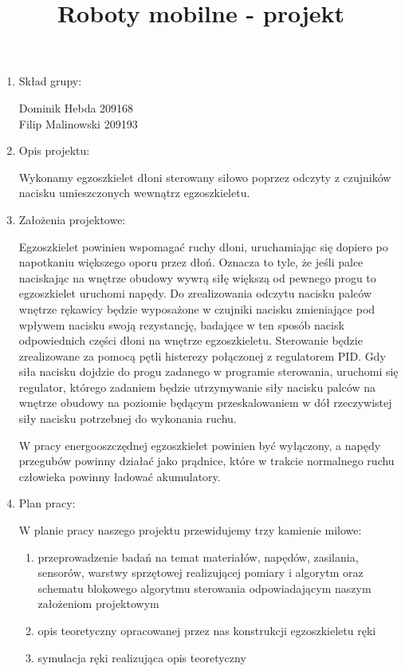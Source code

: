 \documentclass[a4paper]{article}
\title{Roboty mobilne - projekt}
\date{}
\begin{document}
\maketitle

\begin{enumerate}

\item Skład grupy:

Dominik Hebda 209168 \\
Filip Malinowski 209193

\item Opis projektu:

Wykonamy egzoszkielet dłoni sterowany siłowo poprzez odczyty z czujników nacisku umieszczonych wewnątrz egzoszkieletu.

\item Założenia projektowe:

Egzoszkielet powinien wspomagać ruchy dłoni, uruchamiając się dopiero po napotkaniu większego oporu przez dłoń. Oznacza to tyle, że jeśli palce naciskając na wnętrze obudowy wywrą siłę większą od pewnego progu to egzoszkielet uruchomi napędy.
Do zrealizowania odczytu nacisku palców wnętrze rękawicy będzie wyposażone w czujniki nacisku zmieniające pod wpływem nacisku swoją rezystancję, badające w ten sposób nacisk odpowiednich części dłoni na wnętrze egzoszkieletu.
Sterowanie będzie zrealizowane za pomocą pętli histerezy połączonej z regulatorem PID. Gdy siła nacisku dojdzie do progu zadanego w programie sterowania, uruchomi się regulator, którego zadaniem będzie utrzymywanie siły nacisku palców na wnętrze obudowy na poziomie będącym przeskalowaniem w dół rzeczywistej siły nacisku potrzebnej do wykonania ruchu.

W pracy energooszczędnej egzoszkielet powinien być wyłączony, a napędy przegubów powinny działać jako prądnice, które w trakcie normalnego ruchu człowieka powinny ładować akumulatory.

\item Plan pracy:

W planie pracy naszego projektu przewidujemy trzy kamienie milowe:
\begin{enumerate}[I -]
\item przeprowadzenie badań na temat materiałów, napędów, zasilania, sensorów, warstwy sprzętowej realizującej pomiary i algorytm oraz schematu blokowego algorytmu sterowania odpowiadającym naszym założeniom projektowym
\item opis teoretyczny opracowanej przez nas konstrukcji egzoszkieletu ręki
\item symulacja ręki realizująca opis teoretyczny
\end{enumerate}


\end{enumerate}
\end{document}
